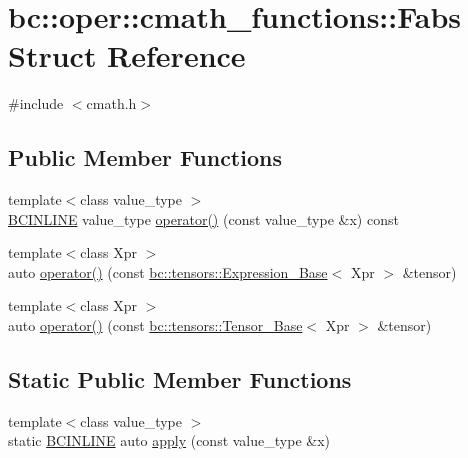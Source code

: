 \hypertarget{structbc_1_1oper_1_1cmath__functions_1_1Fabs}{}\section{bc\+:\+:oper\+:\+:cmath\+\_\+functions\+:\+:Fabs Struct Reference}
\label{structbc_1_1oper_1_1cmath__functions_1_1Fabs}


{\ttfamily \#include $<$cmath.\+h$>$}

\subsection*{Public Member Functions}
\begin{DoxyCompactItemize}
\item 
{\footnotesize template$<$class value\+\_\+type $>$ }\\\hyperlink{common_8h_a6699e8b0449da5c0fafb878e59c1d4b1}{B\+C\+I\+N\+L\+I\+NE} value\+\_\+type \hyperlink{structbc_1_1oper_1_1cmath__functions_1_1Fabs_a5872f68d1c2865969966205909b3ecd6}{operator()} (const value\+\_\+type \&x) const
\item 
{\footnotesize template$<$class Xpr $>$ }\\auto \hyperlink{structbc_1_1oper_1_1cmath__functions_1_1Fabs_a7d193d08ea5a6be88ef55f78fe3d5113}{operator()} (const \hyperlink{classbc_1_1tensors_1_1Expression__Base}{bc\+::tensors\+::\+Expression\+\_\+\+Base}$<$ Xpr $>$ \&tensor)
\item 
{\footnotesize template$<$class Xpr $>$ }\\auto \hyperlink{structbc_1_1oper_1_1cmath__functions_1_1Fabs_a039ff734277c7c78123daaf5bb19bcba}{operator()} (const \hyperlink{classbc_1_1tensors_1_1Tensor__Base}{bc\+::tensors\+::\+Tensor\+\_\+\+Base}$<$ Xpr $>$ \&tensor)
\end{DoxyCompactItemize}
\subsection*{Static Public Member Functions}
\begin{DoxyCompactItemize}
\item 
{\footnotesize template$<$class value\+\_\+type $>$ }\\static \hyperlink{common_8h_a6699e8b0449da5c0fafb878e59c1d4b1}{B\+C\+I\+N\+L\+I\+NE} auto \hyperlink{structbc_1_1oper_1_1cmath__functions_1_1Fabs_a1416b22883953e408e08d2c2f46e2018}{apply} (const value\+\_\+type \&x)
\end{DoxyCompactItemize}


